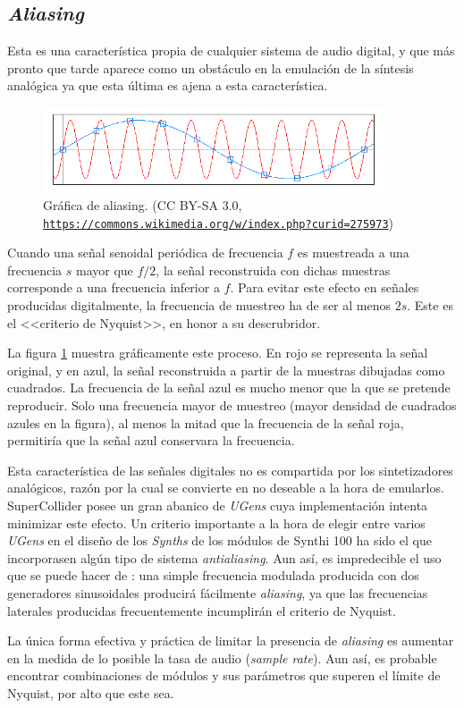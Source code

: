 \subsection{\textit{Aliasing}}
Esta es una característica propia de cualquier sistema de audio digital, y que más pronto que tarde aparece como un obstáculo en la emulación de la síntesis analógica ya que esta última es ajena a esta característica.

\begin{figure}
	\centering
	\includegraphics[width=0.9\textwidth]{images/aliasing}
	\caption[Gráfica de \textit{aliasing}]{Gráfica de aliasing. (CC BY-SA 3.0,\\ \href{https://commons.wikimedia.org/w/index.php?curid=275973}{\texttt{https://commons.wikimedia.org/w/index.php?curid=275973}})}
	\label{fig:aliasing}
\end{figure}

Cuando una señal senoidal periódica de frecuencia $f$ es muestreada a una frecuencia $s$ mayor que $f/2$, la señal reconstruida con dichas muestras corresponde a una frecuencia inferior a $f$. Para evitar este efecto en señales producidas digitalmente, la frecuencia de muestreo ha de ser al menos $2s$. Este es el <<criterio de Nyquist>>, en honor a su descrubridor. 

La figura \ref{fig:aliasing} muestra gráficamente este proceso. En rojo se representa la señal original, y en azul, la señal reconstruida a partir  de la muestras dibujadas como cuadrados. La frecuencia de la señal azul es mucho menor que la que se pretende reproducir. Solo una frecuencia mayor de muestreo (mayor densidad de cuadrados azules en la figura), al menos la mitad que la frecuencia de la señal roja, permitiría que la señal azul conservara la frecuencia.

Esta característica de las señales digitales no es compartida por los sintetizadores analógicos, razón por la cual se convierte en no deseable a la hora de emularlos. SuperCollider posee un gran abanico de \textit{UGens} cuya implementación intenta minimizar este efecto. Un criterio importante a la hora de elegir entre varios \textit{UGens} en el diseño de los \textit{Synths} de los módulos de Synthi 100 ha sido el que incorporasen algún tipo de sistema \textit{antialiasing}. Aun así, es impredecible el uso que se puede hacer de \appName: una simple frecuencia modulada producida con dos generadores sinusoidales producirá fácilmente \textit{aliasing}, ya que las frecuencias laterales producidas frecuentemente incumplirán el criterio de Nyquist.

La única forma efectiva y práctica de limitar la presencia de \textit{aliasing} es aumentar en la medida de lo posible la tasa de audio (\textit{sample rate}). Aun así, es probable encontrar combinaciones de módulos y sus parámetros que superen el límite de Nyquist, por alto que este sea.




